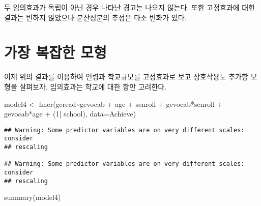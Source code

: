 \documentclass[
]{book}
\newenvironment{Shaded}{\begin{snugshade}}{\end{snugshade}}
\newcommand{\AttributeTok}[1]{\textcolor[rgb]{0.77,0.63,0.00}{#1}}
\newcommand{\DecValTok}[1]{\textcolor[rgb]{0.00,0.00,0.81}{#1}}
\newcommand{\FunctionTok}[1]{\textcolor[rgb]{0.00,0.00,0.00}{#1}}
\newcommand{\NormalTok}[1]{#1}
\newcommand{\OtherTok}[1]{\textcolor[rgb]{0.56,0.35,0.01}{#1}}
\newcommand{\SpecialCharTok}[1]{\textcolor[rgb]{0.00,0.00,0.00}{#1}}
\begin{document}
두 임의효과가 독립이 아닌 경우 나타난 경고는 나오지 않는다. 또한 고정효과에 대한 결과는
변하지 않았으나 분산성분의 추정은 다소 변화가 있다.

\hypertarget{uxac00uxc7a5-uxbcf5uxc7a1uxd55c-uxbaa8uxd615}{%
\section{가장 복잡한 모형}\label{uxac00uxc7a5-uxbcf5uxc7a1uxd55c-uxbaa8uxd615}}

이제 위의 결과를 이용하여 연령과 학교규모를 고정효과로 보고 상호작용도 추가함 모형을 살펴보자.
임의효과는 학교에 대한 항만 고려한다.

\begin{Shaded}
\begin{Highlighting}[]
\NormalTok{model4 }\OtherTok{\textless{}{-}} \FunctionTok{lmer}\NormalTok{(geread}\SpecialCharTok{\textasciitilde{}}\NormalTok{gevocab }\SpecialCharTok{+}\NormalTok{ age }\SpecialCharTok{+}\NormalTok{ senroll }\SpecialCharTok{+}\NormalTok{ gevocab}\SpecialCharTok{*}\NormalTok{senroll  }\SpecialCharTok{+}\NormalTok{ gevocab}\SpecialCharTok{*}\NormalTok{age }\SpecialCharTok{+}\NormalTok{  (}\DecValTok{1}\SpecialCharTok{|}\NormalTok{ school), }\AttributeTok{data=}\NormalTok{Achieve)}
\end{Highlighting}
\end{Shaded}

\begin{verbatim}
## Warning: Some predictor variables are on very different scales: consider
## rescaling

## Warning: Some predictor variables are on very different scales: consider
## rescaling
\end{verbatim}

\begin{Shaded}
\begin{Highlighting}[]
\FunctionTok{summary}\NormalTok{(model4)}
\end{Highlighting}
\end{Shaded}
\end{document}

